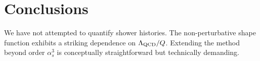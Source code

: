 \section{Conclusions}\label{sec:conclusions}

We have not attempted to quantify shower histories. The non-perturbative
shape function exhibits a striking dependence on $\Lambda_{\rm QCD}/Q$.
Extending the method beyond order $\alpha_s^3$ is conceptually
straightforward but technically demanding.

